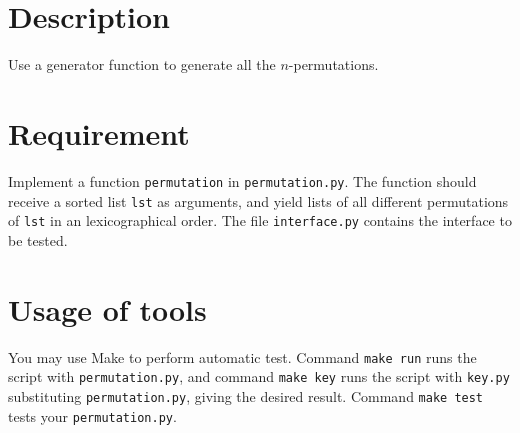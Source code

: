 \documentclass[english, nochinese]{../../TeXTemplate/pkupaper}
\title{\titlemark}
\author{pppppass}
\date{January 22, 2018}
\begin{document}
\maketitle

\section{Description}

Use a generator function to generate all the $n$-permutations.

\section{Requirement}

Implement a function \verb"permutation" in \verb"permutation.py". The function should receive a sorted list \verb"lst" as arguments, and yield lists of all different permutations of \verb"lst" in an lexicographical order. The file \verb"interface.py" contains the interface to be tested.

\section{Usage of tools}

You may use Make to perform automatic test. Command \verb"make run" runs the script with \verb"permutation.py", and command \verb"make key" runs the script with \verb"key.py" substituting \verb"permutation.py", giving the desired result. Command \verb"make test" tests your \verb"permutation.py".
\end{document}

